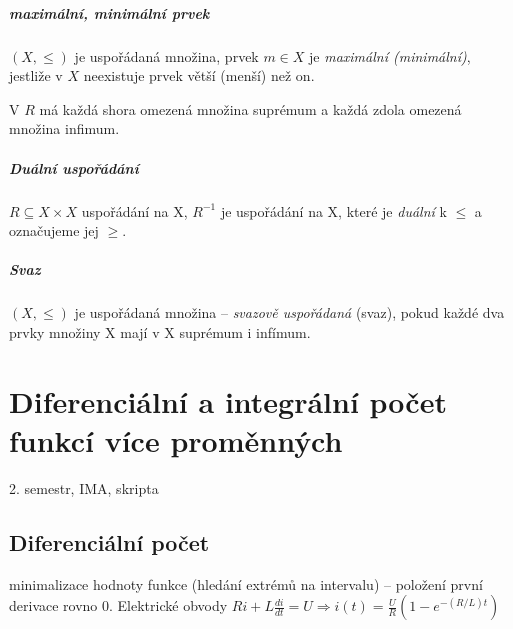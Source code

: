 \documentclass[a4paper, 11pt]{report}
\begin{document}
\paragraph{maximální, minimální prvek}
$(X, \leq)$ je uspořádaná množina, prvek $m \in X$ je \emph{maximální (minimální)}, jestliže v $X$ neexistuje prvek větší (menší) než on.

V $R$ má každá shora omezená množina suprémum a každá zdola omezená množina infimum.

\paragraph{Duální uspořádání}
$R \subseteq X \times X$ uspořádání na X, $R^{-1}$ je uspořádání na X, které je \emph{duální} k $\leq$ a označujeme jej $\geq$.

\paragraph{Svaz}
$(X, \leq)$ je uspořádaná množina -- \emph{svazově uspořádaná} (svaz), pokud každé dva prvky množiny X mají v X suprémum i infímum.








































\chapter{Diferenciální a integrální počet funkcí více proměnných} \label{cha:17}

2. semestr, IMA, skripta

\section{Diferenciální počet}
minimalizace hodnoty funkce (hledání extrémů na intervalu) -- položení první derivace rovno 0.
Elektrické obvody $Ri + L\frac{di}{dt} = U \Rightarrow i(t) = \frac{U}{R}\left(1-e^{-(R/L)t} \right)$
\end{document}
